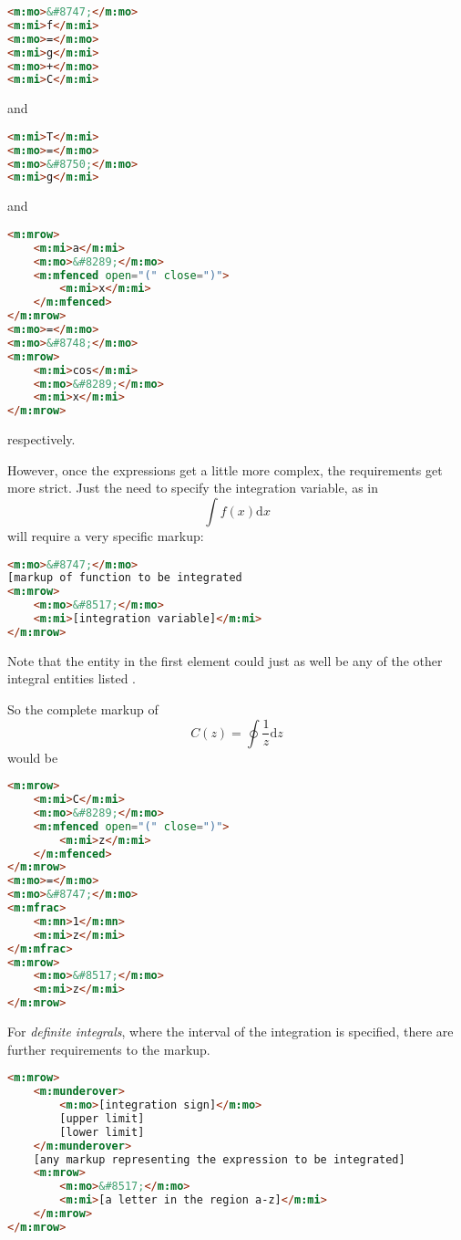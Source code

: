 \documentclass[english,a4paper,11pt]{article}
\begin{document}
\begin{lstlisting}[language=HTML]
<m:mo>&#8747;</m:mo>
<m:mi>f</m:mi>
<m:mo>=</m:mo>
<m:mi>g</m:mi>
<m:mo>+</m:mo>
<m:mi>C</m:mi>
\end{lstlisting}
and
\begin{lstlisting}[language=HTML]
<m:mi>T</m:mi>
<m:mo>=</m:mo>
<m:mo>&#8750;</m:mo>
<m:mi>g</m:mi>	
\end{lstlisting}
and
\begin{lstlisting}[language=HTML]
<m:mrow>
	<m:mi>a</m:mi>
	<m:mo>&#8289;</m:mo>
	<m:mfenced open="(" close=")">
		<m:mi>x</m:mi>
	</m:mfenced>
</m:mrow>
<m:mo>=</m:mo>
<m:mo>&#8748;</m:mo>
<m:mrow>
	<m:mi>cos</m:mi>
	<m:mo>&#8289;</m:mo>
	<m:mi>x</m:mi>
</m:mrow>
\end{lstlisting}
respectively.

\bigskip
However, once the expressions get a little more complex, the requirements get more strict. Just the need to specify the integration variable, as in 
\begin{equation}
\int f(x) \text{d}x
\end{equation}
will require a very specific markup:
\begin{lstlisting}[language=HTML]
<m:mo>&#8747;</m:mo>
[markup of function to be integrated
<m:mrow>
	<m:mo>&#8517;</m:mo>
	<m:mi>[integration variable]</m:mi>
</m:mrow>
\end{lstlisting}
Note that the  entity in the first  element could just as well be any of the other integral entities listed .

So the complete markup of 
\begin{equation}
C(z) = \oint \frac{1}{z}\text{d}z
\end{equation}
would be
\begin{lstlisting}[language=HTML]
<m:mrow>
	<m:mi>C</m:mi>
	<m:mo>&#8289;</m:mo>
	<m:mfenced open="(" close=")">
		<m:mi>z</m:mi>
	</m:mfenced>
</m:mrow>
<m:mo>=</m:mo>
<m:mo>&#8747;</m:mo>
<m:mfrac>
	<m:mn>1</m:mn>
	<m:mi>z</m:mi>
</m:mfrac>
<m:mrow>
	<m:mo>&#8517;</m:mo>
	<m:mi>z</m:mi>
</m:mrow>
\end{lstlisting}

\bigskip
For \emph{definite integrals}, where the interval of the integration is specified, there are further requirements to the markup.
\begin{lstlisting}[language=HTML]
<m:mrow>
	<m:munderover>
		<m:mo>[integration sign]</m:mo>
		[upper limit]
		[lower limit]
	</m:munderover>
	[any markup representing the expression to be integrated]
	<m:mrow>
		<m:mo>&#8517;</m:mo>
		<m:mi>[a letter in the region a-z]</m:mi>
	</m:mrow>
</m:mrow>
\end{lstlisting}
\end{document}
